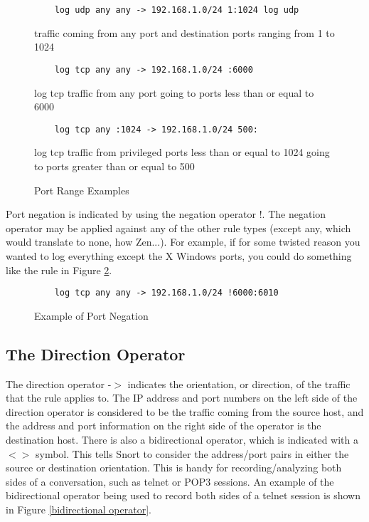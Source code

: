 \documentclass[english]{report}
\begin{document}
\begin{center}
\begin{figure}
\begin{verbatim}
    log udp any any -> 192.168.1.0/24 1:1024 log udp 
\end{verbatim}

traffic coming from any port and destination ports ranging from 1 to 1024

\begin{verbatim}
    log tcp any any -> 192.168.1.0/24 :6000 
\end{verbatim}

log tcp traffic from any port going to ports less than or equal to 6000

\begin{verbatim}
    log tcp any :1024 -> 192.168.1.0/24 500: 
\end{verbatim}

log tcp traffic from privileged ports less than or equal to 1024 going to ports
greater than or equal to 500

\caption{\label{port range examples}Port Range Examples}
\end{figure}
\end{center}

Port negation is indicated by using the negation operator !.  The negation
operator may be applied against any of the other rule types (except any, which
would translate to none, how Zen...). For example, if for some twisted reason
you wanted to log everything except the X Windows ports, you could do something
like the rule in Figure \ref{example port negation}.

\begin{figure}
\begin{verbatim}
    log tcp any any -> 192.168.1.0/24 !6000:6010
\end{verbatim}

\caption{\label{example port negation}Example of Port Negation}
\end{figure}

\subsection{The Direction Operator}

The direction operator -$>$ indicates the orientation, or direction, of the
traffic that the rule applies to. The IP address and port numbers on the left
side of the direction operator is considered to be the traffic coming from the
source host, and the address and port information on the right side of the
operator is the destination host. There is also a bidirectional operator, which
is indicated with a $<>$ symbol. This tells Snort to consider the address/port
pairs in either the source or destination orientation. This is handy for
recording/analyzing both sides of a conversation, such as telnet or POP3
sessions. An example of the bidirectional operator being used to record both
sides of a telnet session is shown in Figure \ref{bidirectional operator}.
\end{document}
